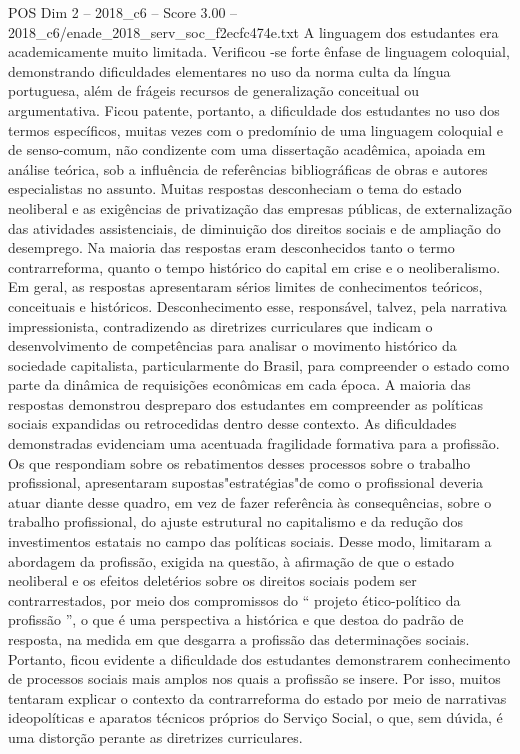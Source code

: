 \begin{textsample}{POS Dim 2 – 2018\_c6 – Score 3.00 – 2018\_c6/enade\_2018\_serv\_soc\_f2ecfc474e.txt}
A linguagem dos estudantes era academicamente muito limitada.
Verificou -se forte ênfase de linguagem coloquial, demonstrando dificuldades elementares no uso da norma culta da língua portuguesa, além de frágeis recursos de generalização conceitual ou argumentativa.
Ficou patente, portanto, a dificuldade dos estudantes no uso dos termos específicos, muitas vezes com o predomínio de uma linguagem coloquial e de senso-comum, não condizente com uma dissertação acadêmica, apoiada em análise teórica, sob a influência de referências bibliográficas de obras e autores especialistas no assunto.
Muitas respostas desconheciam o tema do estado neoliberal e as exigências de privatização das empresas públicas, de externalização das atividades assistenciais, de diminuição dos direitos sociais e de ampliação do desemprego.
Na maioria das respostas eram desconhecidos tanto o termo contrarreforma, quanto o tempo histórico do capital em crise e o neoliberalismo.
Em geral, as respostas apresentaram sérios limites de conhecimentos teóricos, conceituais e históricos.
Desconhecimento esse, responsável, talvez, pela narrativa impressionista, contradizendo as diretrizes curriculares que indicam o desenvolvimento de competências para analisar o movimento histórico da sociedade capitalista, particularmente do Brasil, para compreender o estado como parte da dinâmica de requisições econômicas em cada época.
A maioria das respostas demonstrou despreparo dos estudantes em compreender as políticas sociais expandidas ou retrocedidas dentro desse contexto.
As dificuldades demonstradas evidenciam uma acentuada fragilidade formativa para a profissão.
Os que respondiam sobre os rebatimentos desses processos sobre o trabalho profissional, apresentaram supostas"estratégias"de como o profissional deveria atuar diante desse quadro, em vez de fazer referência às consequências, sobre o trabalho profissional, do ajuste estrutural no capitalismo e da redução dos investimentos estatais no campo das políticas sociais.
Desse modo, limitaram a abordagem da profissão, exigida na questão, à afirmação de que o estado neoliberal e os efeitos deletérios sobre os direitos sociais podem ser contrarrestados, por meio dos compromissos do “ projeto ético-político da profissão ”, o que é uma perspectiva a histórica e que destoa do padrão de resposta, na medida em que desgarra a profissão das determinações sociais.
Portanto, ficou evidente a dificuldade dos estudantes demonstrarem conhecimento de processos sociais mais amplos nos quais a profissão se insere.
Por isso, muitos tentaram explicar o contexto da contrarreforma do estado por meio de narrativas ideopolíticas e aparatos técnicos próprios do Serviço Social, o que, sem dúvida, é uma distorção perante as diretrizes curriculares.

\end{textsample}
